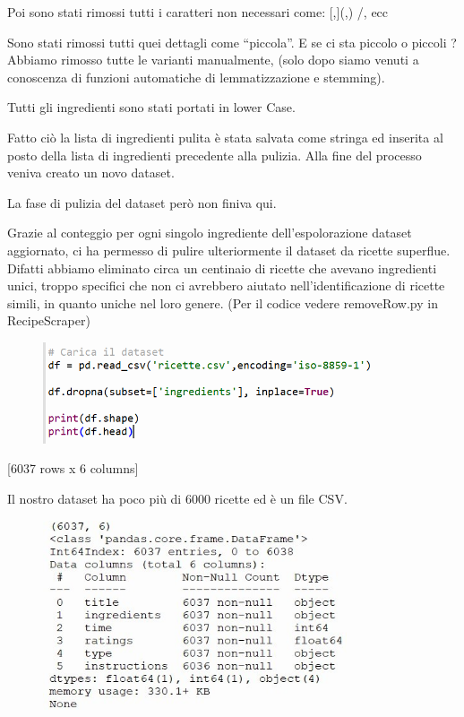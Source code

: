 \documentclass[12pt]{report}
\begin{document}
Poi sono stati rimossi tutti i caratteri non necessari come: [,](,) /, ecc

Sono stati rimossi tutti quei dettagli come “piccola”. E se ci sta piccolo o piccoli ? Abbiamo rimosso tutte le varianti manualmente, (solo dopo siamo venuti a conoscenza di funzioni automatiche di lemmatizzazione e stemming).

Tutti gli ingredienti sono stati portati in lower Case.

Fatto ciò la lista di ingredienti pulita è stata salvata come stringa ed inserita al posto della lista di ingredienti precedente alla pulizia. Alla fine del processo veniva creato un novo dataset.

La fase di pulizia del dataset però non finiva qui.

Grazie al conteggio per ogni singolo ingrediente dell'espolorazione dataset aggiornato, ci ha permesso di pulire ulteriormente il dataset da ricette superflue. Difatti abbiamo eliminato circa un centinaio di ricette che avevano ingredienti unici, troppo specifici che non ci avrebbero aiutato nell’identificazione di ricette simili, in quanto uniche nel loro genere. (Per il codice vedere removeRow.py in RecipeScraper)

\begin{figure}[H]
        \centering
        {\includegraphics[width=0.9\textwidth]{img/img4.jpg}}
\end{figure}
[6037 rows x 6 columns]

 Il nostro dataset ha poco più di 6000 ricette ed è un file CSV.

\begin{figure}[H]
        \centering
        {\includegraphics[width=0.8\textwidth]{img/img5.jpg}}
\end{figure}
\end{document}
